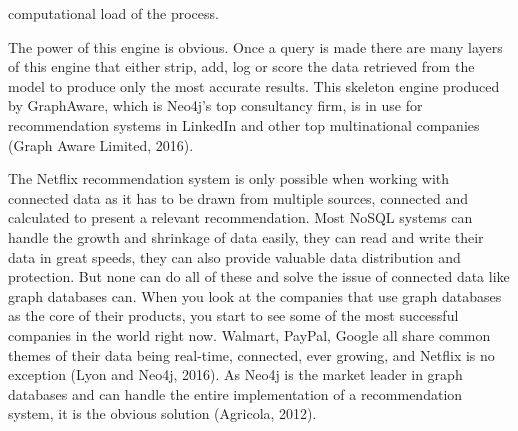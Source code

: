 \documentclass[a4paper]{article}
\begin{document}
computational load of the process.

The power of this engine is obvious. Once a query is made there are many layers of this engine that either strip, add, log or score the data retrieved from the model to produce only the most accurate results. This skeleton engine produced by GraphAware, which is Neo4j's top consultancy firm, is in use for recommendation systems in LinkedIn and other top multinational companies (Graph Aware Limited, 2016).

The Netflix recommendation system is only possible when working with connected data as it has to be drawn from multiple sources, connected and calculated to present a relevant recommendation. Most NoSQL systems can handle the growth and shrinkage of data easily, they can read and write their data in great speeds, they can also provide valuable data distribution and protection. But none can do all of these and solve the issue of connected data like graph databases can. When you look at the companies that use graph databases as the core of their products, you start to see some of the most successful companies in the world right now. Walmart, PayPal, Google all share common themes of their data being real-time, connected, ever growing, and Netflix is no exception (Lyon and Neo4j, 2016). As Neo4j is the market leader in graph databases and can handle the entire implementation of a recommendation system, it is the obvious solution (Agricola, 2012). \par
\end{document}

